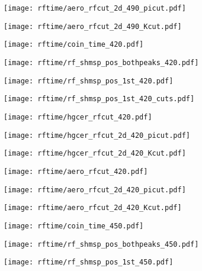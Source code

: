 \documentclass[aspectratio=169,xcolor=dvipsnames]{beamer}
\begin{document}
\begin{frame}
  \texttt{[image: rftime/aero\_rfcut\_2d\_490\_picut.pdf]}
\end{frame}
\begin{frame}
  \texttt{[image: rftime/aero\_rfcut\_2d\_490\_Kcut.pdf]}
\end{frame}
\begin{frame}
  \texttt{[image: rftime/coin\_time\_420.pdf]}
\end{frame}
\begin{frame}
  \texttt{[image: rftime/rf\_shmsp\_pos\_bothpeaks\_420.pdf]}
\end{frame}
\begin{frame}
  \texttt{[image: rftime/rf\_shmsp\_pos\_1st\_420.pdf]}
\end{frame}
\begin{frame}
  \texttt{[image: rftime/rf\_shmsp\_pos\_1st\_420\_cuts.pdf]}
\end{frame}
\begin{frame}
  \texttt{[image: rftime/hgcer\_rfcut\_420.pdf]}
\end{frame}
\begin{frame}
  \texttt{[image: rftime/hgcer\_rfcut\_2d\_420\_picut.pdf]}
\end{frame}
\begin{frame}
  \texttt{[image: rftime/hgcer\_rfcut\_2d\_420\_Kcut.pdf]}
\end{frame}
\begin{frame}
  \texttt{[image: rftime/aero\_rfcut\_420.pdf]}
\end{frame}
\begin{frame}
  \texttt{[image: rftime/aero\_rfcut\_2d\_420\_picut.pdf]}
\end{frame}
\begin{frame}
  \texttt{[image: rftime/aero\_rfcut\_2d\_420\_Kcut.pdf]}
\end{frame}
\begin{frame}
  \texttt{[image: rftime/coin\_time\_450.pdf]}
\end{frame}
\begin{frame}
  \texttt{[image: rftime/rf\_shmsp\_pos\_bothpeaks\_450.pdf]}
\end{frame}
\begin{frame}
  \texttt{[image: rftime/rf\_shmsp\_pos\_1st\_450.pdf]}
\end{frame}
\end{document}
